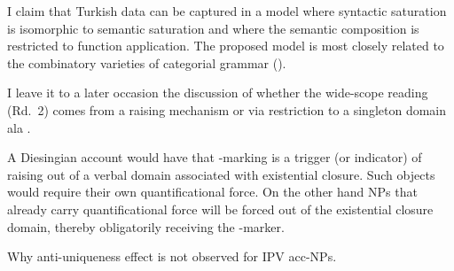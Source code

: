\documentclass[11pt,a4paper]{article}
\begin{document}
I claim that Turkish data can be captured in a model where syntactic saturation is isomorphic to semantic saturation and where the semantic composition is restricted to function application. The proposed model is most closely related to the combinatory varieties of categorial grammar (\cite{steedman00b,jacobson99}). 

I leave it to a later occasion the discussion of whether the wide-scope
reading (Rd.\ 2) comes from a raising mechanism or via restriction to a
singleton domain ala .

A Diesingian account would have that \acc-marking is a trigger (or indicator) of
raising out of a verbal domain associated with existential closure. Such objects
would require their own quantificational force. On the other hand NPs that
already carry quantificational force will be forced out of the existential
closure domain, thereby obligatorily receiving the \acc-marker.


\begin{uquestion}
Why anti-uniqueness effect is not observed for IPV acc-NPs.
\end{uquestion}
\end{document}
